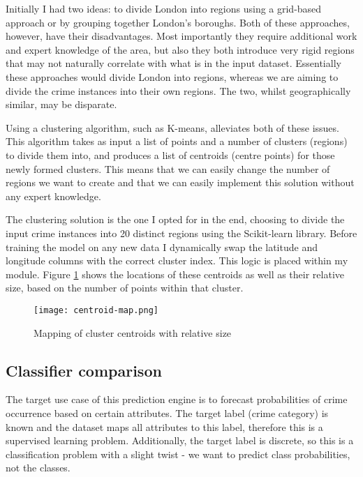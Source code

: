 \documentclass{article}
\begin{document}
	Initially I had two ideas: to divide London into regions using a grid-based approach or by grouping together London's boroughs. Both of these approaches, however, have their disadvantages. Most importantly they require additional work and expert knowledge of the area, but also they both introduce very rigid regions that may not naturally correlate with what is in the input dataset. Essentially these approaches would divide London into regions, whereas we are aiming to divide the crime instances into their own regions. The two, whilst geographically similar, may be disparate.

	Using a clustering algorithm, such as K-means, alleviates both of these issues. This algorithm takes as input a list of points and a number of clusters (regions) to divide them into, and produces a list of centroids (centre points) for those newly formed clusters. This means that we can easily change the number of regions we want to create and that we can easily implement this solution without any expert knowledge.

	The clustering solution is the one I opted for in the end, choosing to divide the input crime instances into 20 distinct regions using the Scikit-learn library. Before training the model on any new data I dynamically swap the latitude and longitude columns with the correct cluster index. This logic is placed within my  module. Figure \ref{fig:map-centroid} shows the locations of these centroids as well as their relative size, based on the number of points within that cluster.

	\begin{figure}[H]
		\centering
		\texttt{[image: centroid-map.png]}

		\scriptsize
		\hfill

		\caption{Mapping of cluster centroids with relative size}
		\label{fig:map-centroid}
	\end{figure}

	\subsection{Classifier comparison}

	The target use case of this prediction engine is to forecast probabilities of crime occurrence based on certain attributes. The target label (crime category) is known and the dataset maps all attributes to this label, therefore this is a supervised learning problem.  Additionally, the target label is discrete, so this is a classification problem with a slight twist - we want to predict class probabilities, not the classes.
\end{document}
